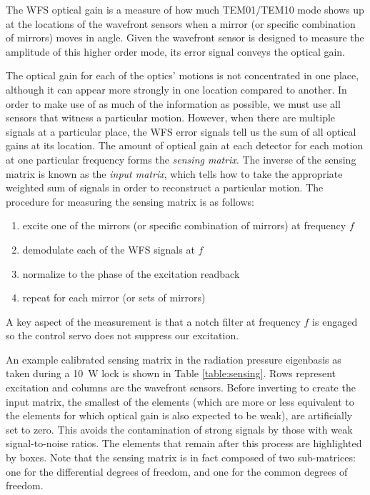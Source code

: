 The WFS optical gain is a measure of how much TEM01/TEM10 mode shows
up at the locations of the wavefront sensors when a mirror (or
specific combination of mirrors) moves in angle. Given the wavefront
sensor is designed to measure the amplitude of this higher order mode,
its error signal conveys the optical gain.

The optical gain for each of the optics' motions is not concentrated
in one place, although it can appear more strongly in one location
compared to another. In order to make use of as much of the
information as possible, we must use all sensors that witness a
particular motion. However, when there are multiple signals at a
particular place, the WFS error signals tell us the sum of all optical
gains at its location. The amount of optical gain at each detector for
each motion at one particular frequency forms the \emph{sensing
  matrix}. The inverse of the sensing matrix is known as the
\emph{input matrix}, which tells how to take the appropriate weighted
sum of signals in order to reconstruct a particular motion. The
procedure for measuring the sensing matrix is as follows:
\begin{enumerate}
\item excite one of the mirrors (or specific combination of mirrors)
  at frequency $f$ \vspace{-10pt}
\item demodulate each of the WFS signals at $f$ \vspace{-10pt}
\item normalize to the phase of the excitation readback \vspace{-10pt}
\item repeat for each mirror (or sets of mirrors)
\end{enumerate}
A key aspect of the measurement is that a notch filter at frequency
$f$ is engaged so the control servo does not suppress our excitation.

An example calibrated sensing matrix in the radiation pressure
eigenbasis as taken during a 10~W lock 
is shown in Table \ref{table:sensing}. Rows represent excitation and
columns are the wavefront sensors.  Before inverting to create the
input matrix, the smallest of the elements (which are more or less
equivalent to the elements for which optical gain is also expected to
be weak), are artificially set to zero. This avoids the contamination
of strong signals by those with weak signal-to-noise ratios. The
elements that remain after this process are highlighted by boxes. Note
that the sensing matrix is in fact composed of two sub-matrices: one
for the differential degrees of freedom, and one for the common
degrees of freedom.

